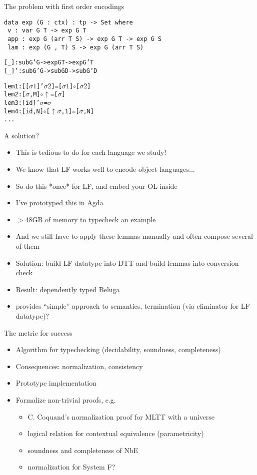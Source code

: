 \documentclass[usenames,dvipsnames]{beamer}
\begin{document}
\begin{frame}[fragile]{The problem with first order encodings}
\begin{verbatim}
data exp (G : ctx) : tp -> Set where
 v : var G T -> exp G T
 app : exp G (arr T S) -> exp G T -> exp G S
 lam : exp (G , T) S -> exp G (arr T S)
\end{verbatim}
\pause
\begin{alltt}
[_] : sub G' G -> exp G T -> exp G' T
[_]' : sub G' G -> sub G D -> sub G' D
\end{alltt}
\pause
\begin{alltt}
lem1 : [ [ \(\sigma1\) ]' \(\sigma2\) ] = [ \(\sigma1\) ] \(\circ\) [ \(\sigma2\) ]
lem2 : [ \(\sigma\) , M ] \(\circ\) \(\uparrow\) = [ \(\sigma\) ]
lem3 : [ id ]' \(\sigma\) = \(\sigma\)
lem4 : [ id , N ] \(\circ\) [ \(\uparrow\) \(\sigma\), 1 ] = [ \(\sigma\) , N ]
...
\end{alltt}
\end{frame}

\begin{frame}{A solution?}
\begin{itemize}
\item This is tedious to do for each language we study!
\pause \item We know that LF works well to encode object languages...
\pause \item So do this *once* for LF, and embed your OL inside
\pause \item I've prototyped this in Agda
\pause \item $>$48GB of memory to typecheck an example
\pause \item And we still have to apply these lemmas manually and often compose several of them
\pause \item Solution: build LF datatype into DTT and build lemmas into conversion check
\pause \item Result: dependently typed Beluga
\pause \item provides ``simple'' approach to semantics, termination (via eliminator for LF datatype)?
\end{itemize}
\end{frame}

\begin{frame}{The metric for success}
\begin{itemize}
\item Algorithm for typechecking (decidability, soundness, completeness)
\item Consequences: normalization, consistency
\item Prototype implementation
\item Formalize non-trivial proofs, e.g.
\begin{itemize}
\item C. Coquand's normalization proof for MLTT with a universe
\item logical relation for contextual equivalence (parametricity)
\item soundness and completeness of NbE
\item normalization for System F?
\end{itemize}
\end{itemize}
\end{frame}
\end{document}
